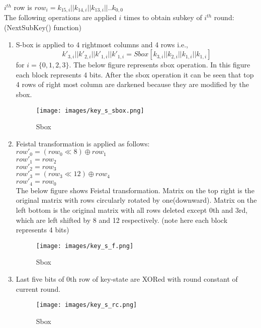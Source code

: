 \documentclass[final]{transcrypto}
\begin{document}
$i^{th}$ row is $row_{i} = k_{15,i}||k_{14,i}||k_{13,i}||..k_{0,0}$\\
\newline
The following operations are applied $i$ times to obtain subkey of $i^{th}$ round:\\
(NextSubKey() function)\\
\begin{enumerate}
    \item S-box is applied to 4 rightmost columns and 4 rows i.e.,
$$k'_{3,i}||k'_{2,i}||k'_{1,i}||k'_{1,i} = Sbox[k_{3,i}||k_{2,i}||k_{1,i}||k_{1,i}]$$ for $i=\{0,1,2,3\}$.
The below figure represents sbox operation. In this figure each block represents 4 bits. After the sbox operation it can be seen that top 4 rows of right most column are darkened because they are modified by the sbox.

\begin{figure}[H]
\caption{Sbox}
\centering
\texttt{[image: images/key\_s\_sbox.png]}
\end{figure}
    \item Feistal transformation is applied as follows:\\
\hspace*{0.7cm}$row'_0 = (row_0\ll 8)\oplus row_1$\\
\hspace*{0.7cm}$row'_1 = row_2$\\
\hspace*{0.7cm}$row'_2 = row_3$\\
\hspace*{0.7cm}$row'_3 = (row_3\ll 12)\oplus row_4$\\
\hspace*{0.7cm}$row'_4 = row_0$\\
The below figure shows Feistal transformation. Matrix on the top right is the original matrix with rows circularly rotated by one(downward). Matrix on the left bottom is the original matrix with all rows deleted except 0th and 3rd, which are left shifted by 8 and 12 respectively. (note here each block represents 4 bits)
\newpage
\begin{figure}[H]
\caption{Sbox}
\centering
\texttt{[image: images/key\_s\_f.png]}
\end{figure}
    \item Last five bits of 0th row  of key-state are XORed with round constant of current round.\\
\begin{figure}[H]
\caption{Sbox}
\centering
\texttt{[image: images/key\_s\_rc.png]}
\end{figure}
\end{enumerate}
\end{document}
